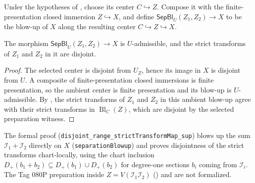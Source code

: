 \begin{definition}
  \label{def:nagata-separate-closed-subschemes}
  \leanok

  Under the hypotheses of
  , choose its center
  $C\hookrightarrow Z$.  Compose it with the finite-presentation closed
  immersion $Z\hookrightarrow X$, and define
  $\mathsf{SepBl}_U(Z_1,Z_2)\to X$ to be the blow-up of $X$ along the
  resulting center $C\hookrightarrow Z\hookrightarrow X$.
\end{definition}

\begin{lemma}
  \label{lemma:nagata-separate-closed-subschemes}
  \leanok

  The morphism $\mathsf{SepBl}_U(Z_1,Z_2)\to X$ is $U$-admissible, and the
  strict transforms of $Z_1$ and $Z_2$ in it are disjoint.
\end{lemma}

\begin{proof}
  \leanok
  The selected center is disjoint from $U_Z$, hence its image in $X$ is
  disjoint from $U$.  A composite of finite-presentation closed immersions is
  finite presentation, so the ambient center is finite presentation and its
  blow-up is $U$-admissible.  By
  , the strict transforms
  of $Z_1$ and $Z_2$ in this ambient blow-up agree with their strict
  transforms in $\operatorname{Bl}_C(Z)$, which are disjoint by the selected
  preparation witness.
\end{proof}

\begin{remark}
  The formal proof
  (\texttt{disjoint\_range\_strictTransformMap\_sup}) blows up the sum
  $\mathcal I_1+\mathcal I_2$ directly on $X$
  (\texttt{separationBlowup}) and proves disjointness of the strict
  transforms chart-locally, using the chart inclusion
  $D_+(b_1+b_2)\subseteq D_+(b_1)\cup D_+(b_2)$ for degree-one sections
  $b_i$ coming from $\mathcal I_i$.  The Tag 080P preparation inside
  $Z=V(\mathcal I_1\mathcal I_2)$
  () and
   are not formalized.
\end{remark}

